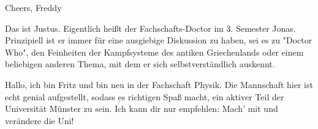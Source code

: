 \begin{multicols*}{2}
{	
	Cheers, Freddy}

{Das ist Justus. Eigentlich heißt der Fachschafts-Doctor im 3. Semester Jonas. Prinzipiell ist er immer für eine ausgiebige Diskussion zu haben, sei es zu "Doctor Who", den Feinheiten der Kampfsysteme des antiken Griechenlands oder einem beliebigen anderen Thema, mit dem er sich selbstverständlich auskennt.}

{Hallo, ich bin Fritz und bin neu in der Fachschaft Physik. Die Mannschaft hier ist echt genial aufgestellt, sodass es richtigen Spaß macht, ein aktiver Teil der Universität Münster zu sein. Ich kann dir nur empfehlen: Mach' mit und verändere die Uni!}
\end{multicols*}
